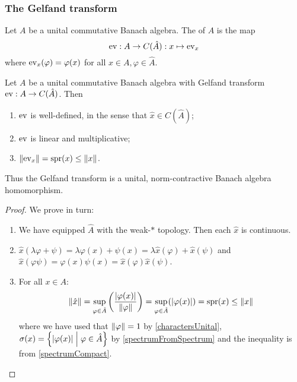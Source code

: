 \subsubsection{The Gelfand transform}
\begin{definition}
Let $A$ be a unital commutative Banach algebra. The  of $A$ is the map
\[ \operatorname{ev} : A\to C(\hat{A}): x\mapsto \operatorname{ev}_x \]
where $\operatorname{ev}_x(\varphi) = \varphi(x)$ for all $x\in A, \varphi\in\hat{A}$.
\end{definition}
\begin{lemma} \label{GelfandTransformHomomorphism}
Let $A$ be a unital commutative Banach algebra with Gelfand transform $\operatorname{ev} : A\to C(\hat{A})$. Then
\begin{enumerate}
\item $\operatorname{ev}$ is well-defined, in the sense that $\hat{x} \in C(\hat{A})$;
\item $\operatorname{ev}$ is linear and multiplicative;
\item $\lVert\operatorname{ev}_{x}\rVert = \operatorname{spr}(x) \leq \lVert x\rVert$.
\end{enumerate}
Thus the Gelfand transform is a unital, norm-contractive Banach algebra homomorphism.
\end{lemma}
\begin{proof}
We prove in turn:
\begin{enumerate}
\item We have equipped $\hat{A}$ with the weak-$*$ topology. Then each $\hat{x}$ is continuous.
\item $\hat{x}(\lambda \varphi + \psi) = \lambda \varphi(x) + \psi(x) = \lambda\hat{x}(\varphi) + \hat{x}(\psi)$ and $\hat{x}(\varphi\psi) = \varphi(x)\psi(x) = \hat{x}(\varphi)\hat{x}(\psi)$.
\item For all $x\in A$:
\[ \lVert\hat{x}\rVert = \sup_{\varphi\in\hat{A}}\left( \frac{|\varphi(x)|}{\lVert\varphi\rVert} \right) = \sup_{\varphi\in\hat{A}}(|\varphi(x)|) = \operatorname{spr}(x) \leq \lVert x\rVert \]
where we have used that $\lVert\varphi\rVert = 1$ by \ref{charactersUnital}, $\spec(x) = \setbuilder{|\varphi(x)|}{\varphi\in\hat{A}}$ by \ref{spectrumFromSpectrum} and the inequality is from \ref{spectrumCompact}.
\end{enumerate}
\end{proof}



